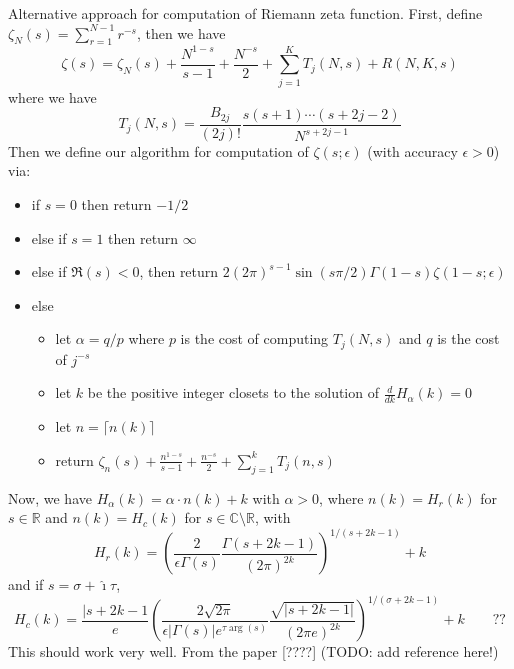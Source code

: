 \documentclass[10pt,dvipdfmx,letterpaper,twoside]{article}
\newcommand{\RR}{{\mathbb{R}}}
\newcommand{\CC}{{\mathbb{C}}}
\newcommand{\ii}{{\hat{\imath}}}
\let\al=\alpha
\let\Gam=\Gamma
\begin{document}
Alternative approach for computation of Riemann zeta function.
First, define $\zeta_N(s) = \sum_{r=1}^{N-1} r^{-s}$, then we have
\[ \zeta(s) = \zeta_N(s) + \frac{N^{1-s}}{s-1} + \frac{N^{-s}}{2} + \sum_{j=1}^K T_j(N,s) + R(N,K,s) \]
where we have
\[ T_j(N,s) = \frac{B_{2j}}{(2j)!} \frac{s(s+1)\cdots(s+2j-2)}{N^{s+2j-1}} \]
Then we define our algorithm for computation of $\zeta(s;\epsilon)$ (with accuracy $\epsilon>0$) via:
\begin{itemize}
  \item if $s=0$ then return $-1/2$
  \item else if $s=1$ then return $\infty$
  \item else if $\Re(s)<0$, then return $2(2\pi)^{s-1} \sin(s\pi/2) \Gamma(1-s) \zeta(1-s;\epsilon)$
  \item else
  \begin{itemize}
    \item let $\al=q/p$ where $p$ is the cost of computing $T_j(N,s)$ and $q$ is the cost of $j^{-s}$
    \item let $k$ be the positive integer closets to the solution of $\frac{d}{dk} H_\al(k)=0$
    \item let $n=\lceil n(k) \rceil$
    \item return $\zeta_n(s) + \frac{n^{1-s}}{s-1} + \frac{n^{-s}}{2} + \sum_{j=1}^k T_j(n,s)$
  \end{itemize}
\end{itemize}
Now, we have $H_\al(k) = \al\cdot n(k) + k$ with $\al>0$, where $n(k)=H_r(k)$ for $s\in\RR$ and $n(k)=H_c(k)$ for $s\in\CC\setminus\RR$,
with
\[ H_r(k) = \left( \frac{2}{\epsilon\Gam(s)} \frac{\Gam(s+2k-1)}{(2\pi)^{2k}} \right)^{1/(s+2k-1)} + k \]
and if $s=\sigma+\ii\tau$,
\[ H_c(k) = \frac{|s+2k-1}{e} \left(\frac{2\sqrt{2\pi}}{\epsilon|\Gam(s)|e^{\tau\arg(s)}} \frac{\sqrt{|s+2k-1|}}{(2\pi e)^{2k}}\right)^{1/(\sigma+2k-1)}  + k
  \qquad\text{??}\]
This should work very well.  From the paper [????] (TODO: add reference here!)
\end{document}
